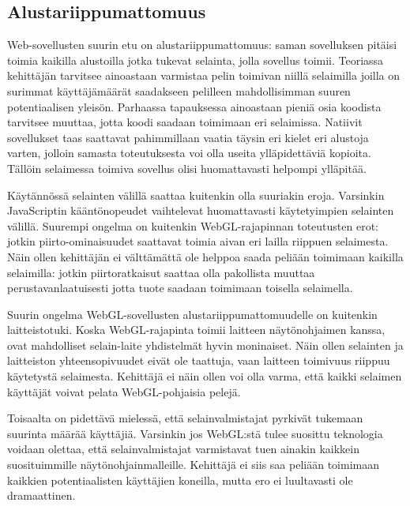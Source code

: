 \subsection{Alustariippumattomuus}
\label{sec_platforms}

Web-sovellusten suurin etu on alustariippumattomuus: saman sovelluksen pitäisi toimia kaikilla alustoilla jotka tukevat selainta, jolla sovellus toimii. Teoriassa kehittäjän tarvitsee ainoastaan varmistaa pelin toimivan niillä selaimilla joilla on surimmat käyttäjämäärät saadakseen pelilleen mahdollisimman suuren potentiaalisen yleisön. Parhaassa tapauksessa ainoastaan pieniä osia koodista tarvitsee muuttaa, jotta koodi saadaan toimimaan eri selaimissa. Natiivit sovellukset taas saattavat pahimmillaan vaatia täysin eri kielet eri alustoja varten, jolloin samasta toteutuksesta voi olla useita ylläpidettäviä kopioita. Tällöin selaimessa toimiva sovellus olisi huomattavasti helpompi ylläpitää.

Käytännössä selainten välillä saattaa kuitenkin olla suuriakin eroja. Varsinkin JavaScriptin kääntönopeudet vaihtelevat huomattavasti käytetyimpien selainten välillä\cite{hoetzlein}. Suurempi ongelma on kuitenkin WebGL-rajapinnan toteutusten erot: jotkin piirto-ominaisuudet saattavat toimia aivan eri lailla riippuen selaimesta\cite{voutilainen}. Näin ollen kehittäjän ei välttämättä ole helppoa saada peliään toimimaan kaikilla selaimilla: jotkin piirtoratkaisut saattaa olla pakollista muuttaa perustavanlaatuisesti jotta tuote saadaan toimimaan toisella selaimella.

Suurin ongelma WebGL-sovellusten alustariippumattomuudelle on kuitenkin laitteistotuki. Koska WebGL-rajapinta toimii laitteen näytönohjaimen kanssa, ovat mahdolliset selain-laite yhdistelmät hyvin moninaiset. Näin ollen selainten ja laitteiston yhteensopivuudet eivät ole taattuja, vaan laitteen toimivuus riippuu käytetystä selaimesta\cite{mozillaBlacklist}\cite{webgl_supported}. Kehittäjä ei näin ollen voi olla varma, että kaikki selaimen käyttäjät voivat pelata WebGL-pohjaisia pelejä.

Toisaalta on pidettävä mielessä, että selainvalmistajat pyrkivät tukemaan suurinta määrää käyttäjiä. Varsinkin jos WebGL:stä tulee suosittu teknologia voidaan olettaa, että selainvalmistajat varmistavat tuen ainakin kaikkein suosituimmille näytönohjainmalleille. Kehittäjä ei siis saa peliään toimimaan kaikkien potentiaalisten käyttäjien koneilla, mutta ero ei luultavasti ole dramaattinen.